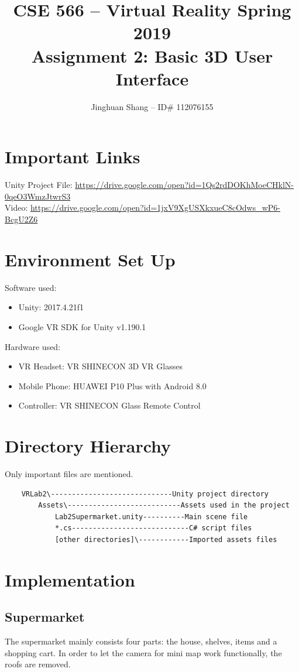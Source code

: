 \documentclass[11pt]{article}
\title{\bf CSE 566 -- 
	Virtual Reality Spring  2019 \\
	Assignment 2: Basic 3D User Interface \\
}
\author{Jinghuan Shang -- ID\# 112076155}
\begin{document}
	\maketitle
	\section{Important Links}
	Unity Project File: \url{https://drive.google.com/open?id=1Qs2rdDOKhMoeCHklN-0qeO3WmzJtwrS3}\\
	Video: \url{https://drive.google.com/open?id=1jxV9XgUSXkxueC8cOdws_wP6-BcgU2Z6}\\
	\section{Environment Set Up}
	Software used:
	\begin{itemize}
		\item Unity: 2017.4.21f1
		\item Google VR SDK for Unity v1.190.1\cite{googlevrsdk}
	\end{itemize}
	Hardware used: 
	\begin{itemize}
		\item VR Headset: VR SHINECON 3D VR Glasses
		\item Mobile Phone: HUAWEI P10 Plus with Android 8.0
		\item Controller: VR SHINECON Glass Remote Control
	\end{itemize}
	
	\section{Directory Hierarchy}
	Only important files are mentioned.
	\begin{lstlisting}
	VRLab2\-----------------------------Unity project directory
		Assets\---------------------------Assets used in the project
			Lab2Supermarket.unity----------Main scene file
			*.cs----------------------------C# script files
			[other directories]\------------Imported assets files\end{lstlisting}
	
	\section{Implementation}
	\subsection{Supermarket}
	The supermarket mainly consists four parts: the house, shelves, items and a shopping cart. In order to let the camera for mini map work functionally, the roofs are removed.
	
\end{document}
